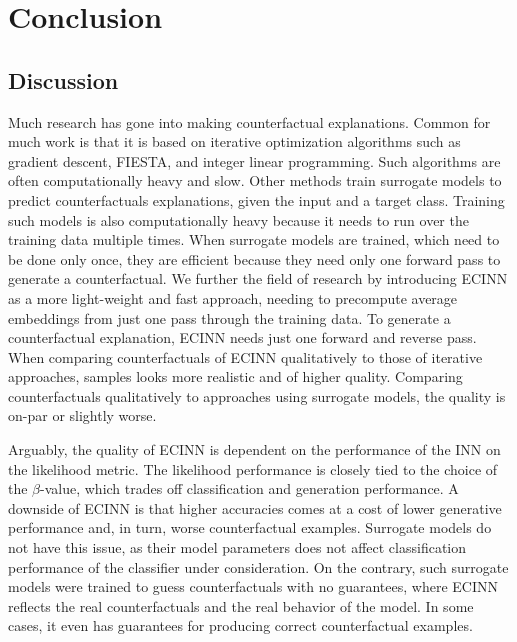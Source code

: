 \documentclass[11pt,a4paper,twoside,openright,final]{memoir}
\begin{document}
\chapter{Conclusion} 



\section{Discussion}
Much research has gone into making counterfactual explanations. 
Common for much work is that it is based on iterative optimization algorithms such as gradient descent, FIESTA, and integer linear programming.
Such algorithms are often computationally heavy and slow.
Other methods train surrogate models to predict counterfactuals explanations, given the input and a target class.
Training such models is also computationally heavy because it needs to run over the training data multiple times.
When surrogate models are trained, which need to be done only once, they are efficient because they need only one forward pass to generate a counterfactual.
We further the field of research by introducing ECINN as a more light-weight and fast approach, needing to precompute average embeddings from just one pass through the training data.
To generate a counterfactual explanation, ECINN needs just one forward and reverse pass. 
When comparing counterfactuals of ECINN qualitatively to those of iterative approaches, samples looks more realistic and of higher quality.
Comparing counterfactuals qualitatively to approaches using surrogate models, the quality is on-par or slightly worse.

Arguably, the quality of ECINN is dependent on the performance of the INN on the likelihood metric.
The likelihood performance is closely tied to the choice of the $\beta$-value, which trades off classification and generation performance.
A downside of ECINN is that higher accuracies comes at a cost of lower generative performance and, in turn, worse counterfactual examples.
Surrogate models do not have this issue, as their model parameters does not affect classification performance of the classifier under consideration.
On the contrary, such surrogate models were trained to guess counterfactuals with no guarantees, where ECINN reflects the real counterfactuals and the real behavior of the model.
In some cases, it even has guarantees for producing correct counterfactual examples.
\end{document}
